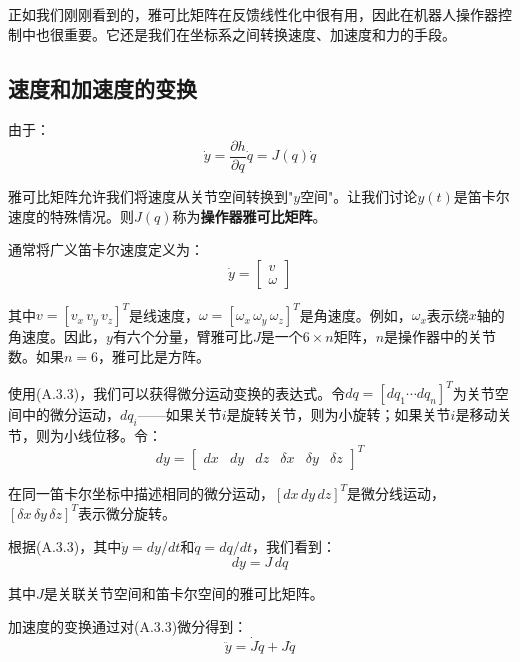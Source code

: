 \documentclass[UTF8,a4paper]{ctexart}
\begin{document}
正如我们刚刚看到的，雅可比矩阵在反馈线性化中很有用，因此在机器人操作器控制中也很重要。它还是我们在坐标系之间转换速度、加速度和力的手段。

\subsection{速度和加速度的变换}

由于：
\begin{equation}
\dot{y} = \frac{\partial h}{\partial q}\dot{q} = J(q)\dot{q}
\tag{A.3.3}
\end{equation}

雅可比矩阵允许我们将速度从关节空间转换到"$y$空间"。让我们讨论$y(t)$是笛卡尔速度的特殊情况。则$J(q)$称为\textbf{操作器雅可比矩阵}。

通常将广义笛卡尔速度定义为：
\begin{equation}
\dot{y} = \begin{bmatrix} v \\ \omega \end{bmatrix}
\tag{A.3.4}
\end{equation}

其中$v = [v_x \, v_y \, v_z]^T$是线速度，$\omega = [\omega_x \, \omega_y \, \omega_z]^T$是角速度。例如，$\omega_x$表示绕$x$轴的角速度。因此，$y$有六个分量，臂雅可比$J$是一个$6 \times n$矩阵，$n$是操作器中的关节数。如果$n=6$，雅可比是方阵。

使用(A.3.3)，我们可以获得微分运动变换的表达式。令$dq = [dq_1 \cdots dq_n]^T$为关节空间中的微分运动，$dq_i$——如果关节$i$是旋转关节，则为小旋转；如果关节$i$是移动关节，则为小线位移。令：
\begin{equation}
dy = \begin{bmatrix} dx & dy & dz & \delta x & \delta y & \delta z \end{bmatrix}^T
\tag{A.3.5}
\end{equation}

在同一笛卡尔坐标中描述相同的微分运动，$[dx \, dy \, dz]^T$是微分线运动，$[\delta x \, \delta y \, \delta z]^T$表示微分旋转。

根据(A.3.3)，其中$\dot{y} = dy/dt$和$\dot{q} = dq/dt$，我们看到：
\begin{equation}
dy = J \, dq
\tag{A.3.6}
\end{equation}

其中$J$是关联关节空间和笛卡尔空间的雅可比矩阵。

加速度的变换通过对(A.3.3)微分得到：
\begin{equation}
\ddot{y} = \dot{J}\dot{q} + J\ddot{q}
\tag{A.3.7}
\end{equation}
\end{document}
